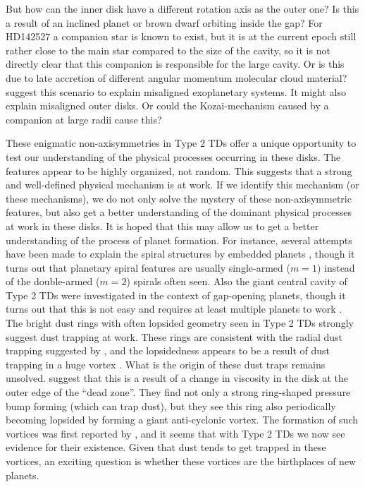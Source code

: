 \documentclass[10pt,fleqn,twoside]{article}
\begin{document}
But how can the inner disk have a different rotation axis as the outer one?
Is this a result of an inclined planet or brown dwarf orbiting inside the
gap? For HD142527 a companion star is known to exist, but it is at the
current epoch still rather close to the main star compared to the size of
the cavity, so it is not directly clear that this companion is responsible
for the large cavity. Or is this due to late accretion of different angular
momentum molecular cloud material? \citet{2011MNRAS.417.1817T} suggest this
scenario to explain misaligned exoplanetary systems. It might also explain
misaligned outer disks. Or could the Kozai-mechanism caused by a companion
at large radii cause this?

These enigmatic non-axisymmetries in Type 2 TDs offer a unique opportunity
to test our understanding of the physical processes occurring in these
disks. The features appear to be highly organized, not random. This suggests
that a strong and well-defined physical mechanism is at work. If we identify
this mechanism (or these mechanisms), we do not only solve the mystery of
these non-axisymmetric features, but also get a better understanding of the
dominant physical processes at work in these disks. It is hoped that this
may allow us to get a better understanding of the process of planet
formation.  For instance, several attempts have been made to explain the
spiral structures by embedded planets \citep{2012ApJ...748L..22M,
  2015A&A...578L...6B, 2015MNRAS.453.1768P}, though it turns out that
planetary spiral features are usually single-armed ($m=1$) instead of the
double-armed ($m=2$) spirals often seen. Also the giant central cavity of
Type 2 TDs were investigated in the context of gap-opening planets, though
it turns out that this is not easy and requires at least multiple planets to
work \citep{2011ApJ...729...47Z}. The bright dust rings with often lopsided
geometry seen in Type 2 TDs strongly suggest dust trapping at work. These
rings are consistent with the radial dust trapping suggested by
\citet{1972fpp..conf..211W}, and the lopsidedness appears to be a result of
dust trapping in a huge vortex \citep{1995A&A...295L...1B,
  1997Icar..128..213K, 2013A&A...550L...8B, 2013A&A...553L...3A,
  2014ApJ...795...53Z, 2016MNRAS.458.3927B}. What is the origin of these
dust traps remains unsolved. \citet{2012MNRAS.419.1701R} suggest that this
is a result of a change in viscosity in the disk at the outer edge of the
``dead zone''.  They find not only a strong ring-shaped pressure bump
forming (which can trap dust), but they see this ring also periodically
becoming lopsided by forming a giant anti-cyclonic vortex. The formation of
such vortices was first reported by \citet{1999ApJ...513..805L}, and it
seems that with Type 2 TDs we now see evidence for their existence. Given
that dust tends to get trapped in these vortices, an exciting question is
whether these vortices are the birthplaces of new planets.
\end{document}
